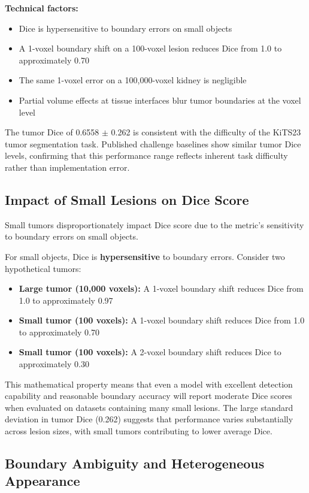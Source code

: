 \textbf{Technical factors:}
\begin{itemize}
    \item Dice is hypersensitive to boundary errors on small objects
    \item A 1-voxel boundary shift on a 100-voxel lesion reduces Dice from 1.0 to approximately 0.70
    \item The same 1-voxel error on a 100,000-voxel kidney is negligible
    \item Partial volume effects at tissue interfaces blur tumor boundaries at the voxel level
\end{itemize}

The tumor Dice of 0.6558 $\pm$ 0.262 is consistent with the difficulty of the KiTS23 tumor segmentation task. Published challenge baselines show similar tumor Dice levels, confirming that this performance range reflects inherent task difficulty rather than implementation error.

\subsection{Impact of Small Lesions on Dice Score}

Small tumors disproportionately impact Dice score due to the metric's sensitivity to boundary errors on small objects.

For small objects, Dice is \textbf{hypersensitive} to boundary errors. Consider two hypothetical tumors:

\begin{itemize}
    \item \textbf{Large tumor (10,000 voxels):} A 1-voxel boundary shift reduces Dice from 1.0 to approximately 0.97
    \item \textbf{Small tumor (100 voxels):} A 1-voxel boundary shift reduces Dice from 1.0 to approximately 0.70
    \item \textbf{Small tumor (100 voxels):} A 2-voxel boundary shift reduces Dice to approximately 0.30
\end{itemize}

This mathematical property means that even a model with excellent detection capability and reasonable boundary accuracy will report moderate Dice scores when evaluated on datasets containing many small lesions. The large standard deviation in tumor Dice (0.262) suggests that performance varies substantially across lesion sizes, with small tumors contributing to lower average Dice.

\subsection{Boundary Ambiguity and Heterogeneous Appearance}

